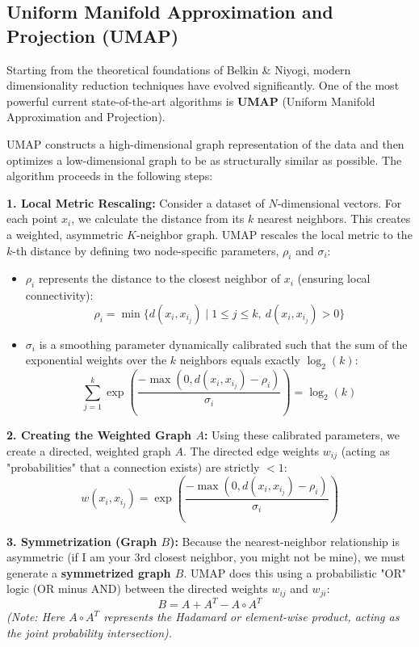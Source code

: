 \subsection{Uniform Manifold Approximation and Projection (UMAP)}
Starting from the theoretical foundations of Belkin \& Niyogi, modern dimensionality reduction techniques have evolved significantly. One of the most powerful current state-of-the-art algorithms is \textbf{UMAP} (Uniform Manifold Approximation and Projection).

UMAP constructs a high-dimensional graph representation of the data and then optimizes a low-dimensional graph to be as structurally similar as possible. The algorithm proceeds in the following steps:

\textbf{1. Local Metric Rescaling:}
Consider a dataset of \( N \)-dimensional vectors. For each point \( x_i \), we calculate the distance from its \( k \) nearest neighbors. This creates a weighted, asymmetric \( K \)-neighbor graph. UMAP rescales the local metric to the \( k \)-th distance by defining two node-specific parameters, \( \rho_i \) and \( \sigma_i \):
\begin{itemize}
    \item \textbf{\( \rho_i \)} represents the distance to the closest neighbor of \( x_i \) (ensuring local connectivity):
          \[
              \rho_i = \min \{ d(x_i, x_{i_j}) \mid 1 \leq j \leq k, \ d(x_i, x_{i_j}) > 0 \}
          \]
    \item \textbf{\( \sigma_i \)} is a smoothing parameter dynamically calibrated such that the sum of the exponential weights over the \( k \) neighbors equals exactly \( \log_2(k) \):
          \[
              \sum_{j=1}^k \exp \left( \frac{-\max(0, d(x_i, x_{i_j}) - \rho_i)}{\sigma_i} \right) = \log_2(k)
          \]
\end{itemize}

\textbf{2. Creating the Weighted Graph \( A \):}
Using these calibrated parameters, we create a directed, weighted graph \( A \). The directed edge weights \( w_{ij} \) (acting as "probabilities" that a connection exists) are strictly \( < 1 \):
\[
    w(x_i, x_{i_j}) = \exp \left( \frac{-\max(0, d(x_i, x_{i_j}) - \rho_i)}{\sigma_i} \right)
\]

\textbf{3. Symmetrization (Graph \( B \)):}
Because the nearest-neighbor relationship is asymmetric (if I am your 3rd closest neighbor, you might not be mine), we must generate a \textbf{symmetrized graph \( B \)}. UMAP does this using a probabilistic "OR" logic (OR minus AND) between the directed weights \( w_{ij} \) and \( w_{ji} \):
\[
    B = A + A^T - A \circ A^T
\]
\textit{(Note: Here \( A \circ A^T \) represents the Hadamard or element-wise product, acting as the joint probability intersection).}

